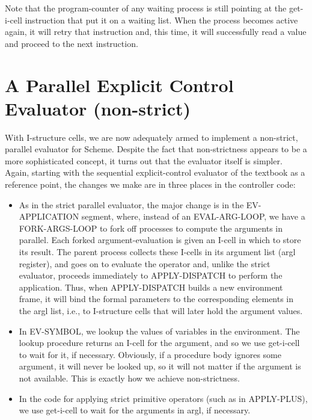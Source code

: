 Note that the program-counter of any waiting process is still pointing
at the {\cf get-i-cell} instruction that put it on a waiting list.
When the process becomes active again, it will retry that instruction
and, this time, it will successfully read a value and proceed to the
next instruction.


\section{A Parallel Explicit Control Evaluator (non-strict)}

\label{non-strict-eceval}

With I-structure cells, we are now adequately armed to implement a
non-strict, parallel evaluator for Scheme.  Despite the fact that
non-strictness appears to be a more sophisticated concept, it turns
out that the evaluator itself is simpler.  Again, starting with the
sequential explicit-control evaluator of the textbook as a reference
point, the changes we make are in three places in the controller code:

\begin{itemize}

\item
 As in the strict parallel evaluator, the major change is in the {\cf
EV-APPLICATION} segment, where, instead of an {\cf EVAL-ARG-LOOP}, we
have a {\cf FORK-ARGS-LOOP} to fork off processes to compute the
arguments in parallel. Each forked argument-evaluation is given an
I-cell in which to store its result.  The parent process collects
these I-cells in its argument list ({\cf argl} register), and goes on
to evaluate the operator and, unlike the strict evaluator, proceeds
immediately to {\cf APPLY-DISPATCH} to perform the application.  Thus,
when {\cf APPLY-DISPATCH} builds a new environment frame, it will bind
the formal parameters to the corresponding elements in the {\cf argl}
list, i.e., to I-structure cells that will later hold the argument
values.

\item In {\cf EV-SYMBOL},  we lookup the values of
variables in the environment.  The lookup procedure returns an I-cell
for the argument, and so we use {\cf get-i-cell} to wait for it, if
necessary.  Obviously, if a procedure body ignores some argument, it
will never be looked up, so it will not matter if the argument is not
available.  This is exactly how we achieve non-strictness.

\item In the code for applying strict primitive operators (such as in {\cf
APPLY-PLUS}), we use {\cf get-i-cell} to wait for the arguments in
{\cf argl}, if necessary.

\end{itemize}

